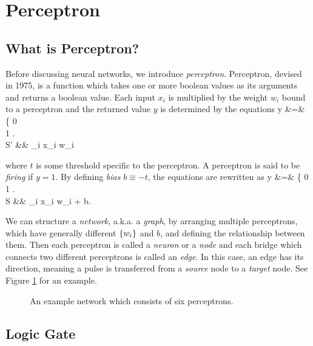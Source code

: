 \documentclass{article}
\theoremstyle{definition}
\newcommand{\fig}[1]{Figure \ref{fig:#1}}
\begin{document}

\newpage
\section{Perceptron}

\subsection{What is Perceptron?} \label{section:2.1}

Before discussing neural networks, we introduce {\it perceptron}. Perceptron, devised in 1975, is a function which takes one or more boolean values as its arguments and returns a boolean value. Each input $x_i$ is multiplied by the weight $w_i$ bound to a perceptron and the returned value $y$ is determined by the equations
\begineq
y &=& \left\{  0  \\ 1  \edarray \right.  \\
S' &\equiv& \sum _i x_i w_i 
\edeq

where $t$ is some threshold specific to the perceptron. A perceptron is said to be {\it firing} if $y = 1$. By defining {\it bias} $b \equiv -t$, the equations are rewritten as
\begineq
y &=& \left\{  0  \\ 1  \edarray \right.  \\
S &\equiv& \sum _i x_i w_i + b. 
\edeq

We can structure a {\it network}, a.k.a. a {\it graph}, by arranging multiple perceptrons, which have generally different $\left\{ w_i \right\}$ and $b$, and defining the relationship between them. Then each perceptron is called a {\it neuron} or a {\it node} and each bridge which connects two different perceptrons is called an {\it edge}. In this case, an edge has its direction, meaning a pulse is transferred from a {\it source} node to a {\it target} node. See \fig{2.1} for an example.

\begin{figure}[H]
    \centering
    \begin{subfigure}[H]{1.0\textwidth}
	\end{subfigure}
    \caption{An example network which consists of six perceptrons.}
    \label{fig:2.1}
\end{figure}

\subsection{Logic Gate}
\end{document}
